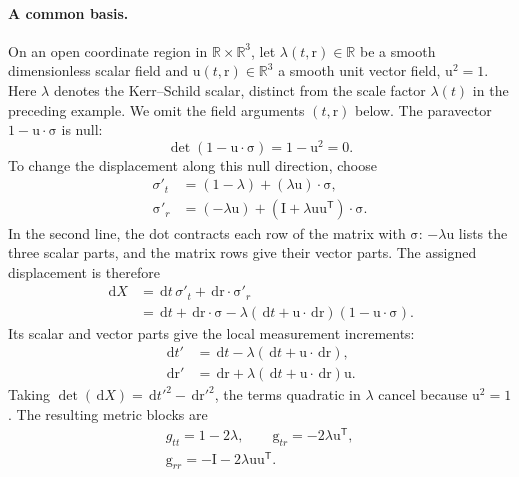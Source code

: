 \documentclass[11pt]{article}
\newcommand{\pv}[1]{{#1}}
\newcommand{\pvGreek}[1]{{#1}}
\newcommand{\vstyle}[1]{{\bm{\mathrm{#1}}}}
\newcommand{\pSigmaTPrime}{\pvsigma'_t}
\newcommand{\bsigRPrime}{\bsig'_r}
\newcommand{\pX}{\pv{X}}
\newcommand{\pvsigma}{\pvGreek{\sigma}}
\numberwithin{equation}{section}
\newcommand{\R}{\mathbb{R}}
\newcommand{\dotprod}{\cdot}
\newcommand{\bsig}{\vstyle{\sigma}}
\newcommand{\br}{\vstyle{r}}
\newcommand{\bu}{\vstyle{u}}
\newcommand{\bg}{\vstyle{g}}
\newcommand{\bI}{\vstyle{I}}
\newcommand{\dd}{\,\mathrm d}
\begin{document}
\paragraph{A common basis.}
On an open coordinate region in $\R\times\R^3$, let
$\lambda(t,\br)\in\R$ be a smooth dimensionless scalar field and
$\bu(t,\br)\in\R^3$ a smooth unit vector field, $\bu^2=1$.
Here $\lambda$ denotes the Kerr--Schild scalar, distinct from the scale
factor $\lambda(t)$ in the preceding example.
We omit the field arguments $(t,\br)$ below. The paravector
$1-\bu\dotprod\bsig$ is null:
\[
 \det(1-\bu\dotprod\bsig)=1-\bu^2=0.
\]
To change the displacement along this null direction, choose
\begin{equation}
 \begin{aligned}
 \pSigmaTPrime&=(1-\lambda)+(\lambda\bu)\dotprod\bsig,\\
 \bsigRPrime&=(-\lambda\bu)
 +(\bI+\lambda\bu\bu^{\mathsf T})\dotprod\bsig.
 \end{aligned}
 \label{eq:kerr-schild-basis}
\end{equation}
In the second line, the dot contracts each row of the matrix with
$\bsig$: $-\lambda\bu$ lists the three scalar parts, and the matrix
rows give their vector parts.
The assigned displacement is therefore
\[
 \begin{aligned}
 \dd\pX&=\dd t\,\pSigmaTPrime+\dd\br\dotprod\bsigRPrime\\
 &=\dd t+\dd\br\dotprod\bsig
 -\lambda(\dd t+\bu\dotprod\dd\br)(1-\bu\dotprod\bsig).
 \end{aligned}
\]
Its scalar and vector parts give the local measurement increments:
\begin{equation}
 \begin{aligned}
 \dd t'&=\dd t-\lambda(\dd t+\bu\dotprod\dd\br),\\
 \dd\br'&=\dd\br+\lambda(\dd t+\bu\dotprod\dd\br)\bu.
 \end{aligned}
 \label{eq:kerr-schild-local-increments}
\end{equation}
Taking $\det(\dd\pX)=\dd t'^2-\dd\br'^2$,
the terms quadratic in $\lambda$ cancel because $\bu^2=1$.
The resulting metric blocks are
\begin{equation}
 \begin{gathered}
 g_{tt}=1-2\lambda,\qquad
 \bg_{tr}=-2\lambda\bu^{\mathsf T},\\
 \bg_{rr}=-\bI-2\lambda\bu\bu^{\mathsf T}.
 \end{gathered}
 \label{eq:kerr-schild-blocks}
\end{equation}
\end{document}
